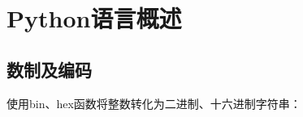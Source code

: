 \documentclass{style/ucasproposal}
\begin{document}
\newpage




\section{Python语言概述}
\subsection{数制及编码}
使用bin、hex函数将整数转化为二进制、十六进制字符串：
\end{document}
